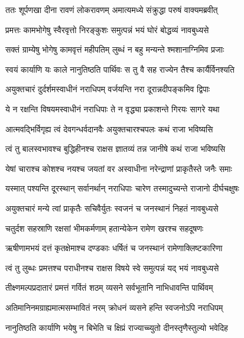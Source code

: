 
\twolineshloka
{ततः शूर्पणखा दीना रावणं लोकरावणम्}
{अमात्यमध्ये संक्रुद्धा परुषं वाक्यमब्रवीत्} %

\twolineshloka
{प्रमत्तः कामभोगेषु स्वैरवृत्तो निरङ्कुशः}
{समुत्पन्नं भयं घोरं बोद्धव्यं नावबुध्यसे} %

\twolineshloka
{सक्तं ग्राम्येषु भोगेषु कामवृत्तं महीपतिम्}
{लुब्धं न बहु मन्यन्ते श्मशानाग्निमिव प्रजाः} %

\twolineshloka
{स्वयं कार्याणि यः काले नानुतिष्ठति पार्थिवः}
{स तु वै सह राज्येन तैश्च कार्यैर्विनश्यति} %

\twolineshloka
{अयुक्तचारं दुर्दर्शमस्वाधीनं नराधिपम्}
{वर्जयन्ति नरा दूरान्नदीपङ्कमिव द्विपाः} %

\twolineshloka
{ये न रक्षन्ति विषयमस्वाधीनं नराधिपाः}
{ते न वृद्ध्या प्रकाशन्ते गिरयः सागरे यथा} %

\twolineshloka
{आत्मवद्भिर्विगृह्य त्वं देवगन्धर्वदानवैः}
{अयुक्तचारश्चपलः कथं राजा भविष्यसि} %

\twolineshloka
{त्वं तु बालस्वभावश्च बुद्धिहीनश्च राक्षस}
{ज्ञातव्यं तन्न जानीषे कथं राजा भविष्यसि} %

\twolineshloka
{येषां चाराश्च कोशश्च नयश्च जयतां वर}
{अस्वाधीना नरेन्द्राणां प्राकृतैस्ते जनैः समाः} %

\twolineshloka
{यस्मात् पश्यन्ति दूरस्थान् सर्वानर्थान् नराधिपाः}
{चारेण तस्मादुच्यन्ते राजानो दीर्घचक्षुषः} %

\twolineshloka
{अयुक्तचारं मन्ये त्वां प्राकृतैः सचिवैर्युतः}
{स्वजनं च जनस्थानं निहतं नावबुध्यसे} %

\twolineshloka
{चतुर्दश सहस्राणि रक्षसां भीमकर्मणाम्}
{हतान्येकेन रामेण खरश्च सहदूषणः} %

\twolineshloka
{ऋषीणामभयं दत्तं कृतक्षेमाश्च दण्डकाः}
{धर्षितं च जनस्थानं रामेणाक्लिष्टकारिणा} %

\twolineshloka
{त्वं तु लुब्धः प्रमत्तश्च पराधीनश्च राक्षस}
{विषये स्वे समुत्पन्नं यद् भयं नावबुध्यसे} %

\twolineshloka
{तीक्ष्णमल्पप्रदातारं प्रमत्तं गर्वितं शठम्}
{व्यसने सर्वभूतानि नाभिधावन्ति पार्थिवम्} %

\twolineshloka
{अतिमानिनमग्राह्यमात्मसम्भावितं नरम्}
{क्रोधनं व्यसने हन्ति स्वजनोऽपि नराधिपम्} %

\twolineshloka
{नानुतिष्ठति कार्याणि भयेषु न बिभेति च}
{क्षिप्रं राज्याच्च्युतो दीनस्तृणैस्तुल्यो भवेदिह} %

